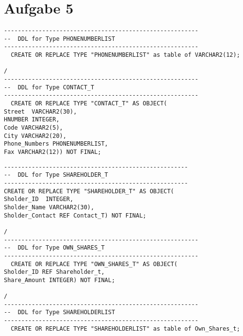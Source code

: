 \documentclass{scrartcl}
\begin{document}
\section*{Aufgabe 5}
\begin{lstlisting}
--------------------------------------------------------
--  DDL for Type PHONENUMBERLIST
--------------------------------------------------------
  CREATE OR REPLACE TYPE "PHONENUMBERLIST" as table of VARCHAR2(12);

/
--------------------------------------------------------
--  DDL for Type CONTACT_T
--------------------------------------------------------
  CREATE OR REPLACE TYPE "CONTACT_T" AS OBJECT(
Street  VARCHAR2(30),
HNUMBER INTEGER,
Code VARCHAR2(5),
City VARCHAR2(20),
Phone_Numbers PHONENUMBERLIST,
Fax VARCHAR2(12)) NOT FINAL;
\end{lstlisting}

\begin{lstlisting}
-----------------------------------------------------
--  DDL for Type SHAREHOLDER_T
-----------------------------------------------------
CREATE OR REPLACE TYPE "SHAREHOLDER_T" AS OBJECT(
Sholder_ID  INTEGER,
Sholder_Name VARCHAR2(30),
Sholder_Contact REF Contact_T) NOT FINAL;

/
--------------------------------------------------------
--  DDL for Type OWN_SHARES_T
--------------------------------------------------------
  CREATE OR REPLACE TYPE "OWN_SHARES_T" AS OBJECT(
Sholder_ID REF Shareholder_t,
Share_Amount INTEGER) NOT FINAL;

/
--------------------------------------------------------
--  DDL for Type SHAREHOLDERLIST
--------------------------------------------------------
  CREATE OR REPLACE TYPE "SHAREHOLDERLIST" as table of Own_Shares_t;
\end{lstlisting}
\end{document}
